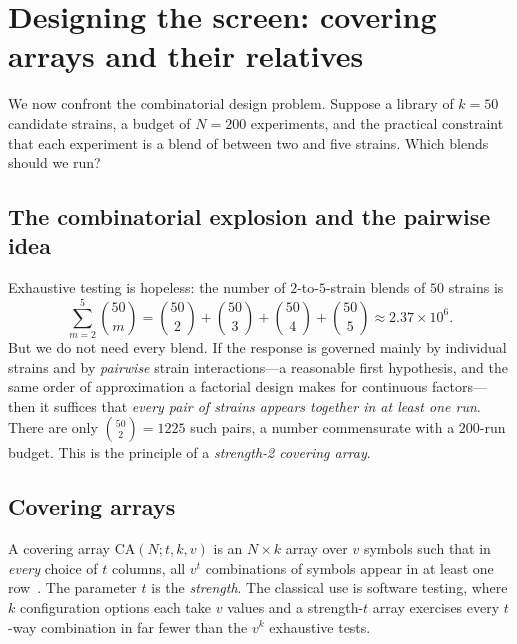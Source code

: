 \section{Designing the screen: covering arrays and their relatives}
\label{sec:ferm-screen}

We now confront the combinatorial design problem. Suppose a library of $k=50$
candidate strains, a budget of $N=200$ experiments, and the practical constraint
that each experiment is a blend of between two and five strains. Which blends
should we run?

\subsection{The combinatorial explosion and the pairwise idea}

Exhaustive testing is hopeless: the number of $2$-to-$5$-strain blends of $50$
strains is
%
\begin{equation}
\sum_{m=2}^{5}\binom{50}{m}
= \binom{50}{2}+\binom{50}{3}+\binom{50}{4}+\binom{50}{5}
\approx 2.37\times 10^{6}.
\end{equation}
%
But we do not need every blend. If the response is governed mainly by individual
strains and by \emph{pairwise} strain interactions---a reasonable first
hypothesis, and the same order of approximation a factorial design makes for
continuous factors---then it suffices that \emph{every pair of strains appears
together in at least one run}. There are only $\binom{50}{2}=1225$ such pairs, a
number commensurate with a $200$-run budget. This is the principle of a
\emph{strength-2 covering array}.

\subsection{Covering arrays}

A covering array $\mathrm{CA}(N;t,k,v)$ is an $N\times k$ array over $v$ symbols
such that in \emph{every} choice of $t$ columns, all $v^t$ combinations of symbols
appear in at least one row~\cite{colbourn}. The parameter $t$ is the
\emph{strength}. The classical use is software testing, where $k$ configuration
options each take $v$ values and a strength-$t$ array exercises every $t$-way
combination in far fewer than the $v^k$ exhaustive tests.

